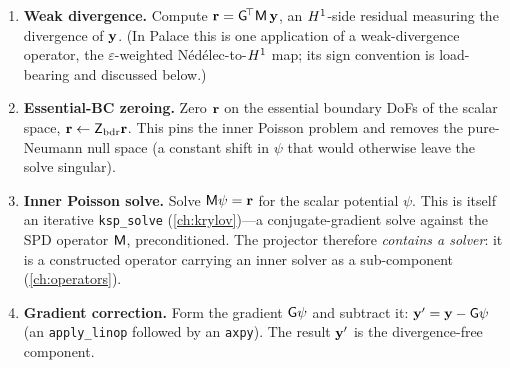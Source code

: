 \begin{enumerate}\setlength\itemsep{2pt}
  \item \textbf{Weak divergence.} Compute $\mathbf{r} = \mathsf{G}^{\!\top}\mathsf{M}\,\mathbf{y}$, an
  $H^1$-side residual measuring the divergence of $\mathbf{y}$. (In Palace this is one
  application of a weak-divergence operator, the $\varepsilon$-weighted
  Nédélec-to-$H^1$ map; its sign convention is load-bearing and discussed below.)
  \item \textbf{Essential-BC zeroing.} Zero $\mathbf{r}$ on the essential boundary DoFs of
  the scalar space, $\mathbf{r}\leftarrow \mathsf{Z}_{\mathrm{bdr}}\mathbf{r}$. This pins the inner
  Poisson problem and removes the pure-Neumann null space (a constant shift in
  $\psi$ that would otherwise leave the solve singular).
  \item \textbf{Inner Poisson solve.} Solve $\mathsf{M}\psi = \mathbf{r}$ for the scalar
  potential $\psi$. This is itself an iterative \texttt{ksp\_solve}
  (\cref{ch:krylov})---a conjugate-gradient solve against the SPD operator
  $\mathsf{M}$, preconditioned. The projector therefore \emph{contains a solver}: it
  is a constructed operator carrying an inner solver as a sub-component
  (\cref{ch:operators}).
  \item \textbf{Gradient correction.} Form the gradient $\mathsf{G}\psi$ and subtract
  it: $\mathbf{y}' = \mathbf{y} - \mathsf{G}\psi$ (an \texttt{apply\_linop} followed by an
  \texttt{axpy}). The result $\mathbf{y}'$ is the divergence-free component.
\end{enumerate}

